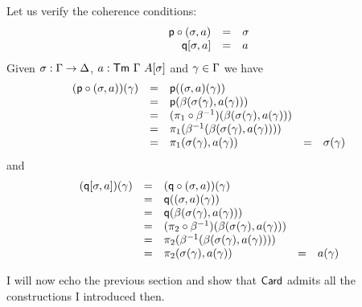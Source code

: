 Let us verify the coherence conditions:
\[
  \begin{array}{rcl}
    \mathsf{p} \circ (\sigma, a) &=& \sigma \\
    \mathsf{q} [\sigma, a] &=& a
  \end{array}
\]
Given \(\sigma : \Gamma \to \Delta\), \(a : \mathsf{Tm}\ \Gamma\ A[\sigma]\) and
\(\gamma \in \Gamma\) we have
\[
  \begin{array}{lclcl}
    (\mathsf{p} \circ (\sigma, a))(\gamma) &=&
    \mathsf{p}((\sigma, a)(\gamma)) \\
    &=& \mathsf{p}(\beta(\sigma(\gamma),a(\gamma))) \\
    &=& (\pi_1 \circ \beta^{-1})(\beta(\sigma(\gamma),a(\gamma))) \\
    &=& \pi_1(\beta^{-1}(\beta(\sigma(\gamma),a(\gamma)))) \\
    &=& \pi_1(\sigma(\gamma), a(\gamma)) &=& \sigma(\gamma)
  \end{array}
\]
and
\[
  \begin{array}{lclcl}
    (\mathsf{q} [\sigma, a])(\gamma) &=&
    (\mathsf{q} \circ (\sigma, a))(\gamma) \\
    &=& \mathsf{q}((\sigma,a)(\gamma)) \\
    &=& \mathsf{q}(\beta(\sigma(\gamma),a(\gamma))) \\
    &=& (\pi_2 \circ \beta^{-1})(\beta(\sigma(\gamma),a(\gamma))) \\
    &=& \pi_2(\beta^{-1}(\beta(\sigma(\gamma),a(\gamma)))) \\
    &=& \pi_2(\sigma(\gamma),a(\gamma)) &=& a(\gamma)
  \end{array}
\]

I will now echo the previous section and show that \(\mathsf{Card}\) admits all the
constructions I introduced then.


